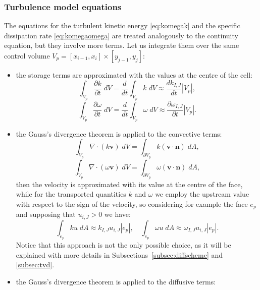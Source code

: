 \subsubsection{Turbulence model equations}
The equations for the turbulent kinetic energy \eqref{eq:komegak} and the 
specific dissipation rate \eqref{eq:komegaomega} are treated analogously to the 
continuity equation, but they involve more terms. Let us integrate them over 
the same control volume  $V_p = [x_{i-1},x_i] \times [y_{j-1},y_j]$:
\begin{itemize}
	\item the storage terms are approximated with the values at the centre of 
	the cell:
	\begin{equation}
	\int_{V_p} \frac{\partial k}{\partial t} \; dV = \frac{d}{dt} \int_{V_p}k 
	\; dV \approx \frac{dk_{I,J}}{dt}|V_p|,
	\end{equation}
	\begin{equation}
	\int_{V_p} \frac{\partial 
	\omega}{\partial t} \; dV = \frac{d}{dt} \int_{V_p} \omega \; dV \approx 
	\frac{\partial \omega_{I,J}}{\partial t}|V_p|.
	\end{equation}
	\item the Gauss's divergence theorem is applied to the convective terms:
	\begin{equation}
		\int_{V_p} \nabla \cdot (k \mathbf{v}) \; dV = \int_{\partial V_p} k 
		(\mathbf{v} 
		\cdot \mathbf{n}) \; dA,
	\end{equation}
	\begin{equation}
	\int_{V_p} \nabla \cdot (\omega \mathbf{v}) \; dV = \int_{\partial V_p} 
	\omega 
	(\mathbf{v} \cdot \mathbf{n}) \; dA,
	\end{equation}
	then the velocity is approximated with its value at the centre of the face, 
	while for the transported quantities $k$ and $\omega$ we employ the 
	upstream value with respect to the sign of the velocity, so considering for 
	example the face $e_p$ and supposing that $u_{i,J}>0$ we have:
	\begin{equation}
		\int_{e_p} ku \; dA \approx k_{I,J}u_{i,J}|e_p|, \quad \int_{e_p} 
		\omega u \; dA \approx \omega_{I,J}u_{i,J}|e_p|.
	\end{equation}
	Notice that this approach is not the only possible choice, as it will be 
	explained with more details in Subsections~\ref{subsec:diffscheme} and 
	\ref{subsec:tvd}.
	\item the Gauss's divergence theorem is applied to the diffusive terms:	
	\begin{equation}

\end{equation}
\end{itemize}
